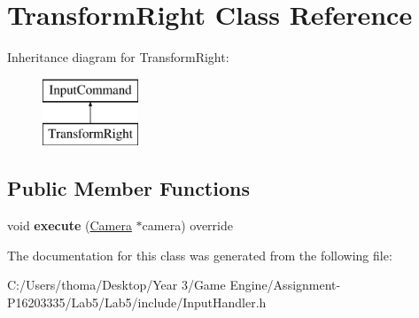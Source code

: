 \hypertarget{class_transform_right}{}\section{Transform\+Right Class Reference}
\label{class_transform_right}
Inheritance diagram for Transform\+Right\+:\begin{figure}[H]
\begin{center}
\leavevmode
\includegraphics[height=2.000000cm]{class_transform_right}
\end{center}
\end{figure}
\subsection*{Public Member Functions}
\begin{DoxyCompactItemize}
\item 
\mbox{\label{class_transform_right_a3607e631626f706beae1da27142bb5e5}} 
void {\bfseries execute} (\mbox{\hyperlink{class_camera}{Camera}} $\ast$camera) override
\end{DoxyCompactItemize}


The documentation for this class was generated from the following file\+:\begin{DoxyCompactItemize}
\item 
C\+:/\+Users/thoma/\+Desktop/\+Year 3/\+Game Engine/\+Assignment-\/\+P16203335/\+Lab5/\+Lab5/include/Input\+Handler.\+h\end{DoxyCompactItemize}
